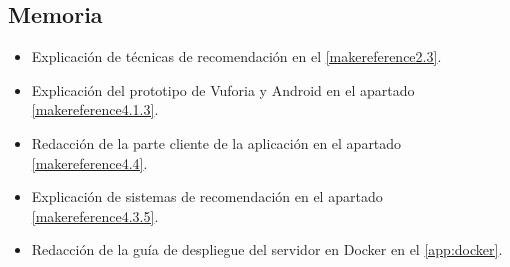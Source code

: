     \subsection{Memoria}
    \label{makereference7.4.3}
        \begin{itemize}
            \item Explicación de técnicas de recomendación en el \autoref{makereference2.3}.
            \item Explicación del prototipo de Vuforia y Android en el apartado \autoref{makereference4.1.3}.
            \item Redacción de la parte cliente de la aplicación en el apartado \autoref{makereference4.4}.
            \item Explicación de sistemas de recomendación en el apartado \autoref{makereference4.3.5}.
            \item Redacción de la guía de despliegue del servidor en Docker en el \autoref{app:docker}.
        \end{itemize}
